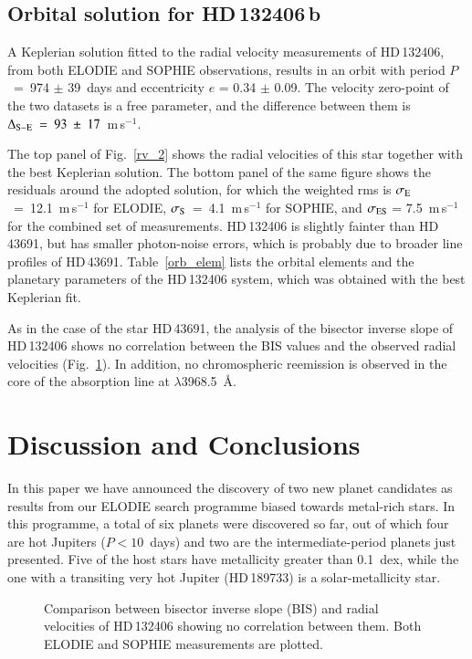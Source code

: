 \documentclass{aa}
\begin{document}
\subsection{Orbital solution for HD\,132406\,b}
A Keplerian solution fitted to the radial velocity measurements of
HD\,132406, from both ELODIE and SOPHIE observations, results in an orbit
with period $P$~=~974 $\pm$ 39~days and eccentricity $e$ = 0.34 $\pm$ 0.09.
The velocity zero-point of the two datasets is a free parameter, and the
difference between them is $\Delta_{\rm S-E}~=~93~\pm~17$~m\,s$^{-1}$.

The top panel of Fig.~\ref{rv_2} shows the radial velocities of this star
together with the best Keplerian solution. The bottom panel of the same
figure shows the residuals around the adopted solution, for which the
weighted rms
is $\sigma_{\rm E}$~=~12.1~m\,s$^{-1}$ for ELODIE,
$\sigma_{\rm S}$~=~4.1~m\,s$^{-1}$ for SOPHIE, and $\sigma_{\rm ES}$ =
7.5~m\,s$^{-1}$ for the combined set of measurements. HD\,132406 is slightly
fainter than HD\,43691, but has smaller photon-noise errors, which is
probably due to
broader line profiles of HD\,43691. Table~\ref{orb_elem} lists the orbital
elements and the planetary parameters of the HD\,132406 system, which was
obtained
with the best Keplerian fit.

As in the case of the star HD\,43691, the analysis of the bisector inverse
slope of HD\,132406 shows no correlation between the BIS values and the
observed radial velocities (Fig.~\ref{bis}). In addition, no chromospheric
reemission is observed in the core of the  absorption line at
$\lambda$3968.5~\AA.

\section{Discussion and Conclusions}
\label{conc}
In this paper we have announced the discovery of two new planet candidates
as results from our ELODIE search programme biased towards metal-rich stars.
In this programme, a total of six planets were discovered so far, out of
which four are hot Jupiters ($P < 10$~days) and two are the
intermediate-period planets just presented. Five of the host stars have
metallicity greater than 0.1~dex, while the one with a transiting very hot
Jupiter (HD\,189733) is a solar-metallicity star.

\begin{figure}[t!]
  \centering
\caption{Comparison between bisector inverse slope (BIS) and radial
           velocities of HD\,132406 showing no correlation between them.
	   Both ELODIE and SOPHIE measurements are plotted.}
  \label{bis}
\end{figure}
\end{document}
